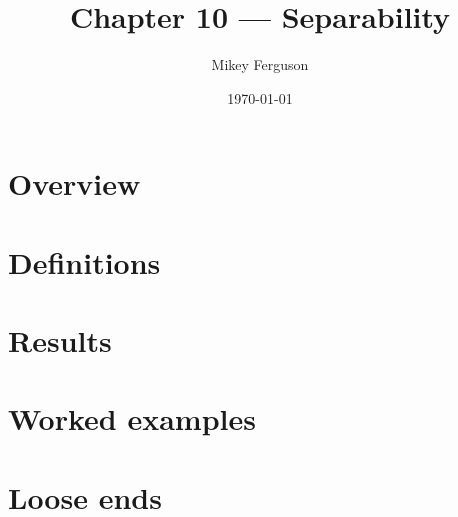 \documentclass[11pt]{article}
\title{Chapter 10 --- Separability}
\author{Mikey Ferguson}
\date{\today}
\begin{document}
\maketitle
\tableofcontents
\bigskip

\section{Overview}

\section{Definitions}

\section{Results}

\section{Worked examples}

\section{Loose ends}
\end{document}
